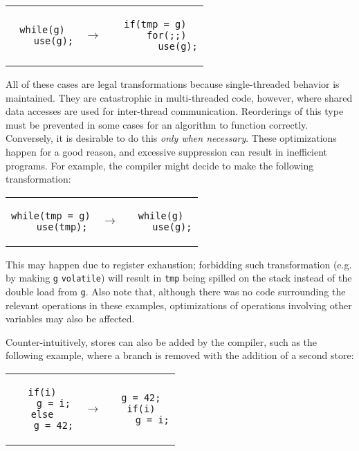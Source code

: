 \begin{center}
    \begin{tabular}{ccc}
        \begin{lstlisting}[style=c]
while(g)
    use(g);
        \end{lstlisting}
        & $\to$ &
        \begin{lstlisting}[style=c]
if(tmp = g)
    for(;;)
        use(g);
        \end{lstlisting}
    \end{tabular}
\end{center}

All of these cases are legal transformations because single-threaded behavior is
maintained.  They are catastrophic in multi-threaded code, however, where shared
data accesses are used for inter-thread communication.  Reorderings of this type
must be prevented in some cases for an algorithm to function correctly.
Conversely, it is desirable to do this \emph{only when necessary}.  These
optimizations happen for a good reason, and excessive suppression can result in
inefficient programs.  For example, the compiler might decide to make the
following transformation:

\begin{center}
    \begin{tabular}{ccc}
        \begin{lstlisting}[style=c]
while(tmp = g)
    use(tmp);
        \end{lstlisting}
        & $\to$ &
        \begin{lstlisting}[style=c]
while(g)
    use(g);
        \end{lstlisting}
    \end{tabular}
\end{center}

This may happen due to register exhaustion; forbidding such transformation (e.g.
by making \texttt{g} \texttt{volatile}) will result in \texttt{tmp} being
spilled on the stack instead of the double load from \texttt{g}.  Also note
that, although there was no code surrounding the relevant operations in these
examples, optimizations of operations involving other variables may also be
affected.

Counter-intuitively, stores can also be added by the compiler, such as the
following example, where a branch is removed with the addition of a second
store:

\begin{center}
    \begin{tabular}{ccc}
        \begin{lstlisting}[style=c]
if(i)
    g = i;
else
    g = 42;
        \end{lstlisting}
        & $\to$ &
        \begin{lstlisting}[style=c]
g = 42;
if(i)
    g = i;
        \end{lstlisting}
    \end{tabular}
\end{center}

